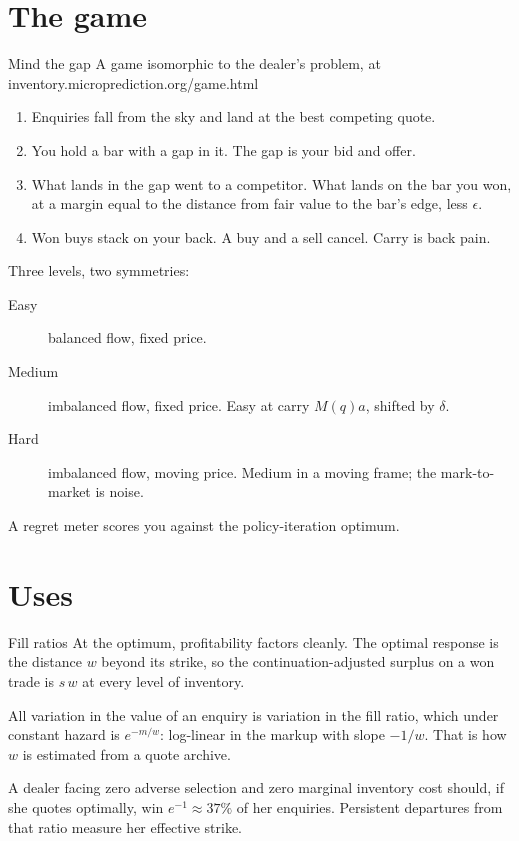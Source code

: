 \documentclass[10pt]{beamer}
\newcommand{\blue}[1]{\textcolor{pcblue}{#1}}
\begin{document}
\section{The game}

\begin{frame}{Mind the gap}
A game isomorphic to the dealer's problem, at \blue{inventory.microprediction.org/game.html}
\begin{enumerate}
\item Enquiries fall from the sky and land at the best competing quote.
\item You hold a bar with a gap in it. The gap is your bid and offer.
\item What lands in the gap went to a competitor. What lands on the bar you won, at a margin equal to the distance from fair value to the bar's edge, less $\epsilon$.
\item Won buys stack on your back. A buy and a sell cancel. Carry is back pain.
\end{enumerate}
\vspace{0.5em}
Three levels, two symmetries:
\begin{description}
\item[Easy] balanced flow, fixed price.
\item[Medium] imbalanced flow, fixed price. Easy at carry $M(q)a$, shifted by $\delta$.
\item[Hard] imbalanced flow, moving price. Medium in a moving frame; the mark-to-market is noise.
\end{description}
A regret meter scores you against the policy-iteration optimum.
\end{frame}

\section{Uses}

\begin{frame}{Fill ratios}
At the optimum, profitability factors cleanly. The optimal response is the distance $w$ beyond its strike, so the continuation-adjusted surplus on a won trade is $s\,w$ at every level of inventory.
\vspace{1em}

All variation in the value of an enquiry is variation in the fill ratio, which under constant hazard is $e^{-m/w}$: log-linear in the markup with slope $-1/w$. That is how $w$ is estimated from a quote archive.
\vspace{1em}

A dealer facing zero adverse selection and zero marginal inventory cost should, if she quotes optimally, win $e^{-1} \approx 37\%$ of her enquiries. Persistent departures from that ratio measure her effective strike.
\end{frame}
\end{document}
